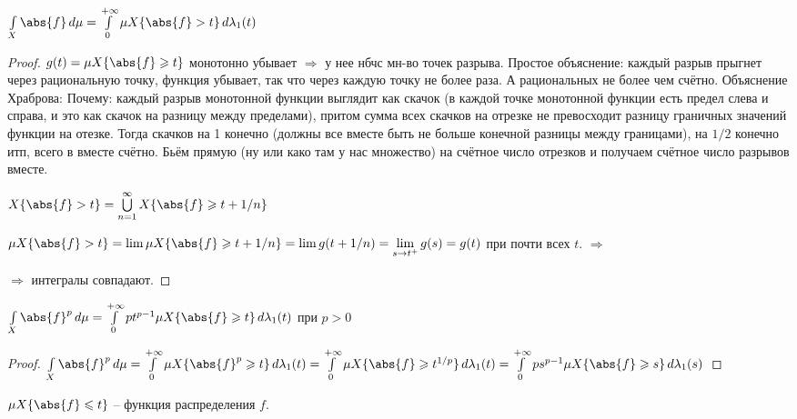 \begin{consequence}
	$\int\limits_X \abs{f}\,d\mu = \int\limits_0^{+\infty}\mu X\{\abs{f} > t\}\,d\lambda_1(t)$
\end{consequence}

\begin{proof}\thmslashn
	
    $g(t) = \mu X\{\abs{f} \geqslant t\}$ монотонно убывает $\Rightarrow$ у нее нбчс мн-во точек разрыва. Простое объяснение: каждый разрыв прыгнет через рациональную точку, функция убывает, так что через каждую точку не более раза. А рациональных не более чем счётно. Объяснение Храброва: Почему: каждый разрыв монотонной функции выглядит как скачок (в каждой точке монотонной функции есть предел слева и справа, и это как скачок на разницу между пределами), притом сумма всех скачков на отрезке не превосходит разницу граничных значений функции на отезке. Тогда скачков на 1 конечно (должны все вместе быть не больше конечной разницы между границами), на $1/2$ конечно итп, всего в вместе счётно. Бьём прямую (ну или како там у нас множество) на счётное число отрезков и получаем счётное число разрывов вместе.
	
	$X\{\abs{f} > t\} = \bigcup\limits_{n=1}^{\infty} X\{\abs{f} \geqslant t + 1/n\}$
	
    $\mu X\{\abs{f} > t\} = \lim \mu X\{\abs{f} \geqslant t + 1/n\} = \lim g(t + 1/n) = \lim\limits_{s\to t^+} g(s) = g(t)$ при почти всех $t$. $\Rightarrow$ 
	
	$\Rightarrow$ интегралы совпадают.
	
\end{proof}


\begin{consequence}
	$\int\limits_X \abs{f}^p\,d\mu = \int\limits_0^{+\infty}pt^{p-1}\mu X\{\abs{f} \geqslant t\}\,d\lambda_1(t)$ при $p>0$
\end{consequence}

\begin{proof}\thmslashn
	
	$\int\limits_X \abs{f}^p\,d\mu = \int\limits_0^{+\infty}\mu X\{\abs{f}^p \geqslant t\}\,d\lambda_1(t) = \int\limits_0^{+\infty}\mu X\{\abs{f} \geqslant t^{1/p}\}\,d\lambda_1(t) = \int\limits_0^{+\infty}ps^{p-1} \mu X\{\abs{f} \geqslant s\}\,d\lambda_1(s)$
	
\end{proof}

\begin{remark}
	$\mu X\{\abs{f} \leqslant t\}$ -- функция распределения $f$.
\end{remark}